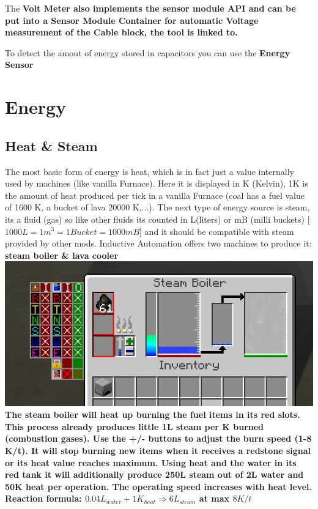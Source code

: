 \documentclass[11pt]{article} %
\begin{document}
The \bf Volt Meter \rm also implements the sensor module API and can be put into a \bf Sensor Module Container \rm for automatic Voltage measurement of the Cable block, the tool is linked to.

To detect the amout of energy stored in capacitors you can use the \bf Energy Sensor \rm

\section{Energy}
\subsection{Heat \& Steam}
The most basic form of energy is heat, which is in fact just a value internally used by machines (like vanilla Furnace). Here it is displayed in K (Kelvin), 1K is the amount of heat produced per tick in a vanilla Furnace (coal has a fuel value of 1600 K, a bucket of lava 20000 K,...). The next type of energy source is steam, its a fluid (gas) so like other fluids its counted in L(liters) or mB (milli buckets) [$1000L = 1m^3 = 1Bucket = 1000mB$] and it should be compatible with steam provided by other mods. Inductive Automation offers two machines to produce it: \bf steam boiler \rm \& \bf lava cooler \rm \\
\includegraphics[width = \textwidth]{steamBoiler}
The steam boiler will heat up burning the fuel items in its red slots. This process already produces little 1L steam per K burned (combustion gases). Use the +/- buttons to adjust the burn speed (1-8 K/t). It will stop burning new items when it receives a redstone signal or its heat value reaches maximum. Using heat and the water in its red tank it will additionally produce 250L steam out of 2L water and 50K heat per operation. The operating speed increases with heat level. \\
Reaction formula: $0.04L_{water} + 1K_{heat} \Longrightarrow 6L_{steam}$ at max $8K/t$ \\
\end{document}
